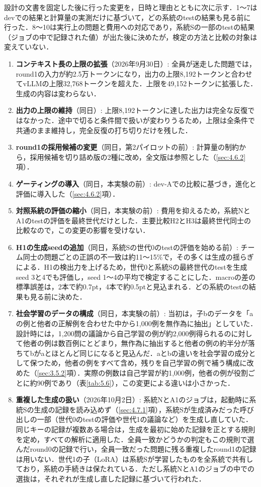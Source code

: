 設計の文書を固定した後に行った変更を，日時と理由とともに次に示す．1〜7はdevでの結果と計算量の実測だけに基づいて，どの系統のtestの結果も見る前に行った．8〜10は実行上の問題と費用への対応であり，系統Sの一部のtestの結果（ジョブの中で記録された値）が出た後に決めたが，検定の方法と比較の対象は変えていない．
\begin{enumerate}
\item \textbf{コンテキスト長の上限の拡張}（2026年9月30日）: 全員が迷走した問題では，round1の入力が約2.5万トークンになり，出力の上限8,192トークンと合わせてvLLMの上限32,768トークンを超えた．上限を49,152トークンに拡張した．生成の内容は変わらない．
\item \textbf{出力の上限の維持}（同日）: 上限8,192トークンに達した出力は完全な反復ではなかった．途中で切ると条件間で扱いが変わりうるため，上限は全条件で共通のまま維持し，完全反復の打ち切りだけを残した．
\item \textbf{round1の採用候補の変更}（同日，第2パイロットの前）: 計算量の制約から，採用候補を切り詰め版の2種に改め，全文版は参照とした（\ref{sec:4.6.2}項）．
\item \textbf{ゲーティングの導入}（同日，本実験の前）: dev-Aでの比較に基づき，進化と評価に導入した（\ref{sec:4.6.2}項）．
\item \textbf{対照系統の評価の縮小}（同日，本実験の前）: 費用を抑えるため，系統NとA1のtestの評価を最終世代だけとした．主要比較H2とH3は最終世代同士の比較なので，この変更の影響を受けない．
\item \textbf{H1の生成seedの追加}（同日，系統Sの世代0のtestの評価を始める前）: チーム同士の問題ごとの正誤の不一致は約11〜15\%で，その多くは生成の揺らぎによる．H1の検出力を上げるため，世代0と系統Sの最終世代のtestを生成seed 3と4でも評価し，seed 1〜4の平均で検定することにした．macroの差の標準誤差は，2本で約0.7pt，4本で約0.5ptと見込まれる．どの系統のtestの結果も見る前に決めた．
\item \textbf{社会学習のデータの構成}（同日，本実験の前）: 当初は，子bのデータを「aの例と他者の正解例を合わせた中から1,000例を無作為に抽出」としていた．設計時には，1,200問の議論から自己学習の例が約2,000例得られるのに対して他者の例は数百例にとどまり，無作為に抽出すると他者の例の約半分が落ちてbがaとほとんど同じになると見込んだ．aとbの違いを社会学習の成分として保つため，他者の例をすべて含め，残りを自己学習の例で補う構成に改めた（\ref{sec:3.5.2}項）．実際の例数は自己学習が約1,000例，他者の例が役割ごとに約90例であり（表\ref{tab:5.6}），この変更による違いは小さかった．
\item \textbf{重複した生成の扱い}（2026年10月2日）: 系統NとA1のジョブは，起動時に系統Sの生成の記録を読み込めず（\ref{sec:4.7.1}項），系統Sが生成済みだった呼び出しの一部（世代0のtestの評価や世代1の議論など）を生成し直していた．同じキーの記録が複数ある場合は，生成を最初に始めた記録を正とする規則を定め，すべての解析に適用した．全員一致かどうかの判定もこの規則で選んだround0の記録で行い，全員一致だった問題に残る重複したround1の記録は用いない．世代1の子（LoRA）は系統Sが学習したものを全系統で共有しており，系統の手続きは保たれている．ただし系統NとA1のジョブの中での選抜は，それぞれが生成し直した記録に基づいて行われた．

\end{enumerate}

